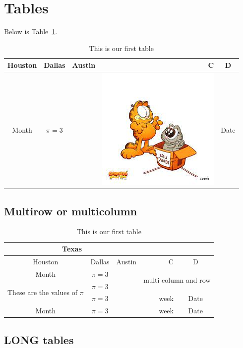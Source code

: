 \documentclass{article}
\theoremstyle{definition}
\theoremstyle{remark}
\begin{document}
\section{Tables}

Below is Table~\ref{tab:1}.

\begin{table}[htbp]
\begin{center}
\caption{This is our first table}\label{tab:1}    
\begin{tabular}{|c c|l|r|c|}
\hline
Houston & Dallas & Austin & C & D \\
\hline \hline
Month & $\pi=3$ &  & \includegraphics[width=0.2\linewidth]{download.jpg} & Date \\
\hline
\end{tabular}

\end{center}
\end{table}

\subsection{Multirow or multicolumn}

\begin{table}[htbp]
\begin{center}
\caption{This is our first table}\label{tab:2}    
\begin{tabular}{|c| c|l|r|c|}
\hline
\multicolumn{3}{|c|}{Texas} & & \\
\hline
Houston & Dallas & Austin & C & D \\
\hline \hline
Month & $\pi=3$ &  & \multicolumn{2}{|c|}{\multirow{2}{*}{multi column and row}}  \\
\multirow{2}{*}{These are the values of $\pi$} & $\pi=3$ &  &  &  \\
 & $\pi=3$ &  & week & Date \\
Month & $\pi=3$ &  & week & Date \\
\hline
\end{tabular}

\end{center}
\end{table}

\subsection{LONG tables}
\end{document}
